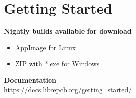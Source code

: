 \section{Getting Started}

\begin{frame}{\secname}
  \begin{center}
    \bigskip \bigskip
    \large\textbf{Nightly builds available for download}
    \begin{itemize}
      \centering
      \item AppImage for Linux
      \item ZIP with *.exe for Windows
    \end{itemize}
  
    \bigskip \bigskip
    \large\textbf{Documentation}\\
    \url{https://docs.librepcb.org/getting_started/}
  \end{center}
\end{frame}